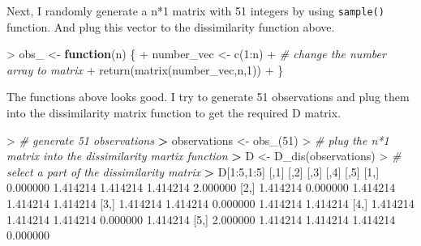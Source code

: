 \documentclass[
]{article}
\newenvironment{Shaded}{\begin{snugshade}}{\end{snugshade}}
\newcommand{\CommentTok}[1]{\textcolor[rgb]{0.56,0.35,0.01}{\textit{#1}}}
\newcommand{\ControlFlowTok}[1]{\textcolor[rgb]{0.13,0.29,0.53}{\textbf{#1}}}
\newcommand{\DecValTok}[1]{\textcolor[rgb]{0.00,0.00,0.81}{#1}}
\newcommand{\ErrorTok}[1]{\textcolor[rgb]{0.64,0.00,0.00}{\textbf{#1}}}
\newcommand{\FloatTok}[1]{\textcolor[rgb]{0.00,0.00,0.81}{#1}}
\newcommand{\FunctionTok}[1]{\textcolor[rgb]{0.00,0.00,0.00}{#1}}
\newcommand{\NormalTok}[1]{#1}
\newcommand{\OtherTok}[1]{\textcolor[rgb]{0.56,0.35,0.01}{#1}}
\newcommand{\SpecialCharTok}[1]{\textcolor[rgb]{0.00,0.00,0.00}{#1}}
\begin{document}
Next, I randomly generate a n*1 matrix with 51 integers by using
\texttt{sample()} function. And plug this vector to the dissimilarity
function above.

\begin{Shaded}
\begin{Highlighting}[]
\SpecialCharTok{\textgreater{}}\NormalTok{ obs\_ }\OtherTok{\textless{}{-}} \ControlFlowTok{function}\NormalTok{(n) \{}
\SpecialCharTok{+}\NormalTok{   number\_vec }\OtherTok{\textless{}{-}} \FunctionTok{c}\NormalTok{(}\DecValTok{1}\SpecialCharTok{:}\NormalTok{n)}
\SpecialCharTok{+}   \CommentTok{\# change the number array to matrix}
\SpecialCharTok{+}   \FunctionTok{return}\NormalTok{(}\FunctionTok{matrix}\NormalTok{(number\_vec,n,}\DecValTok{1}\NormalTok{))}
\SpecialCharTok{+}\NormalTok{ \}}
\end{Highlighting}
\end{Shaded}

The functions above looks good. I try to generate 51 observations and
plug them into the dissimilarity matrix function to get the required D
matrix.

\begin{Shaded}
\begin{Highlighting}[]
\SpecialCharTok{\textgreater{}} \CommentTok{\# generate 51 observations}
\ErrorTok{\textgreater{}}\NormalTok{ observations }\OtherTok{\textless{}{-}} \FunctionTok{obs\_}\NormalTok{(}\DecValTok{51}\NormalTok{)}
\SpecialCharTok{\textgreater{}} \CommentTok{\# plug the n*1 matrix into the dissimilarity martix function}
\ErrorTok{\textgreater{}}\NormalTok{ D }\OtherTok{\textless{}{-}} \FunctionTok{D\_dis}\NormalTok{(observations)}
\SpecialCharTok{\textgreater{}} \CommentTok{\# select a part of the dissimilarity matrix}
\ErrorTok{\textgreater{}}\NormalTok{ D[}\DecValTok{1}\SpecialCharTok{:}\DecValTok{5}\NormalTok{,}\DecValTok{1}\SpecialCharTok{:}\DecValTok{5}\NormalTok{]}
\NormalTok{         [,}\DecValTok{1}\NormalTok{]     [,}\DecValTok{2}\NormalTok{]     [,}\DecValTok{3}\NormalTok{]     [,}\DecValTok{4}\NormalTok{]     [,}\DecValTok{5}\NormalTok{]}
\NormalTok{[}\DecValTok{1}\NormalTok{,] }\FloatTok{0.000000} \FloatTok{1.414214} \FloatTok{1.414214} \FloatTok{1.414214} \FloatTok{2.000000}
\NormalTok{[}\DecValTok{2}\NormalTok{,] }\FloatTok{1.414214} \FloatTok{0.000000} \FloatTok{1.414214} \FloatTok{1.414214} \FloatTok{1.414214}
\NormalTok{[}\DecValTok{3}\NormalTok{,] }\FloatTok{1.414214} \FloatTok{1.414214} \FloatTok{0.000000} \FloatTok{1.414214} \FloatTok{1.414214}
\NormalTok{[}\DecValTok{4}\NormalTok{,] }\FloatTok{1.414214} \FloatTok{1.414214} \FloatTok{1.414214} \FloatTok{0.000000} \FloatTok{1.414214}
\NormalTok{[}\DecValTok{5}\NormalTok{,] }\FloatTok{2.000000} \FloatTok{1.414214} \FloatTok{1.414214} \FloatTok{1.414214} \FloatTok{0.000000}
\end{Highlighting}
\end{Shaded}
\end{document}
